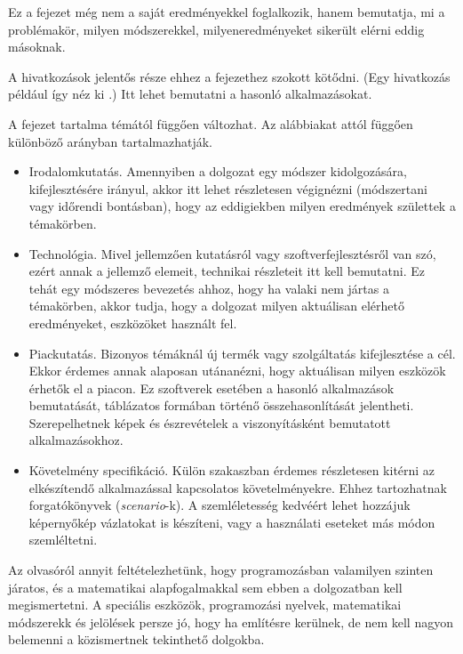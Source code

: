 
Ez a fejezet még nem a saját eredményekkel foglalkozik, hanem bemutatja, mi a problémakör, milyen módszerekkel, milyeneredményeket sikerült elérni eddig másoknak.

A hivatkozások jelentős része ehhez a fejezethez szokott kötődni.
(Egy hivatkozás például így néz ki \cite{coombs1987markup}.)
Itt lehet bemutatni a hasonló alkalmazásokat.


A fejezet tartalma témától függően változhat. Az alábbiakat attól függően különböző arányban tartalmazhatják.
\begin{itemize}
\item Irodalomkutatás. Amennyiben a dolgozat egy módszer kidolgozására, kifejlesztésére irányul, akkor itt lehet részletesen végignézni (módszertani vagy időrendi bontásban), hogy az eddigiekben milyen eredmények születtek a témakörben.
\item Technológia. Mivel jellemzően kutatásról vagy szoftverfejlesztésről van szó, ezért annak a jellemző elemeit, technikai részleteit itt kell bemutatni.
Ez tehát egy módszeres bevezetés ahhoz, hogy ha valaki nem jártas a témakörben, akkor tudja, hogy a dolgozat milyen aktuálisan elérhető eredményeket, eszközöket használt fel.
\item Piackutatás. Bizonyos témáknál új termék vagy szolgáltatás kifejlesztése a cél.
Ekkor érdemes annak alaposan utánanézni, hogy aktuálisan milyen eszközök érhetők el a piacon.
Ez szoftverek esetében a hasonló alkalmazások bemutatását, táblázatos formában történő összehasonlítását jelentheti.
Szerepelhetnek képek és észrevételek a viszonyításként bemutatott alkalmazásokhoz.
\item Követelmény specifikáció. Külön szakaszban érdemes részletesen kitérni az elkészítendő alkalmazással kapcsolatos követelményekre.
Ehhez tartozhatnak forgatókönyvek (\textit{scenario}-k).
A szemléletesség kedvéért lehet hozzájuk képernyőkép vázlatokat is készíteni, vagy a használati eseteket más módon szemléltetni.
\end{itemize}


Az olvasóról annyit feltételezhetünk, hogy programozásban valamilyen szinten járatos, és a matematikai alapfogalmakkal sem ebben a dolgozatban kell megismertetni.
A speciális eszközök, programozási nyelvek, matematikai módszerekk és jelölések persze jó, hogy ha említésre kerülnek, de nem kell nagyon belemenni a közismertnek tekinthető dolgokba.
